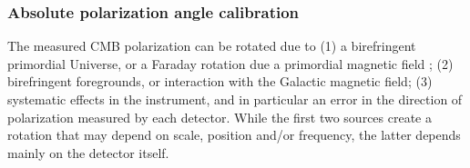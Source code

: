 \documentclass[PICOReport.tex]{subfiles}
\begin{document}
%

\subsubsection{Absolute polarization angle calibration}
\label{sec:angle}

The measured CMB polarization can be rotated due to (1) a birefringent primordial Universe, or a Faraday rotation
due a primordial magnetic field \citep{Pogosian+2018}; (2) birefringent
foregrounds, or interaction with the Galactic magnetic field;
(3) systematic effects in the instrument, and in particular an error in
the direction of polarization measured by each detector.  
While the first two sources create a rotation that may depend on scale,
position and/or frequency, the latter depends mainly on
the detector itself. 
\end{document}
